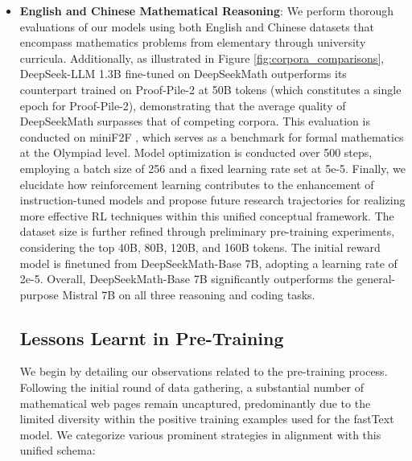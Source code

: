 \begin{itemize}[topsep=0pt]
    \item \textbf{English and Chinese Mathematical Reasoning}: We perform thorough evaluations of our models using both English and Chinese datasets that encompass mathematics problems from elementary through university curricula. Additionally, as illustrated in Figure \ref{fig:corpora_comparisons}, DeepSeek-LLM 1.3B fine-tuned on DeepSeekMath outperforms its counterpart trained on Proof-Pile-2 at 50B tokens (which constitutes a single epoch for Proof-Pile-2), demonstrating that the average quality of DeepSeekMath surpasses that of competing corpora. This evaluation is conducted on miniF2F \citep{minif2f}, which serves as a benchmark for formal mathematics at the Olympiad level. Model optimization is conducted over 500 steps, employing a batch size of 256 and a fixed learning rate set at 5e-5. Finally, we elucidate how reinforcement learning contributes to the enhancement of instruction-tuned models and propose future research trajectories for realizing more effective RL techniques within this unified conceptual framework. The dataset size is further refined through preliminary pre-training experiments, considering the top 40B, 80B, 120B, and 160B tokens. The initial reward model is finetuned from DeepSeekMath-Base 7B, adopting a learning rate of 2e-5. Overall, DeepSeekMath-Base 7B significantly outperforms the general-purpose Mistral 7B \citep{mistral} on all three reasoning and coding tasks. \subsection{Lessons Learnt in Pre-Training}

We begin by detailing our observations related to the pre-training process. Following the initial round of data gathering, a substantial number of mathematical web pages remain uncaptured, predominantly due to the limited diversity within the positive training examples used for the fastText model. We categorize various prominent strategies in alignment with this unified schema:

\end{itemize}
